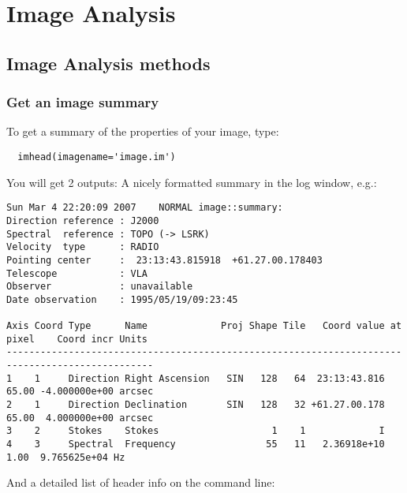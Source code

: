 \chapter{Image Analysis}
\label{chapter:image.analysis}

\vspace{3mm}

\section{Image Analysis methods}
\label{section:analysis.methods}

\subsection{Get an image summary}
\label{subsection:image.summary}

To get a summary of the properties of your image, type: 
\small
\begin{verbatim}
  imhead(imagename='image.im')
\end{verbatim}
\normalsize

\noindent
You will get 2 outputs: A nicely formatted summary in the log window, e.g.: 

\small
\begin{verbatim}
Sun Mar 4 22:20:09 2007    NORMAL image::summary:
Direction reference : J2000
Spectral  reference : TOPO (-> LSRK)
Velocity  type      : RADIO
Pointing center     :  23:13:43.815918  +61.27.00.178403
Telescope           : VLA
Observer            : unavailable
Date observation    : 1995/05/19/09:23:45

Axis Coord Type      Name             Proj Shape Tile   Coord value at pixel    Coord incr Units
------------------------------------------------------------------------------------------------ 
1    1     Direction Right Ascension   SIN   128   64  23:13:43.816    65.00 -4.000000e+00 arcsec
2    1     Direction Declination       SIN   128   32 +61.27.00.178    65.00  4.000000e+00 arcsec
3    2     Stokes    Stokes                    1    1             I
4    3     Spectral  Frequency                55   11   2.36918e+10     1.00  9.765625e+04 Hz
\end{verbatim}
\normalsize

\noindent
And a detailed list of header info on the command line: 

